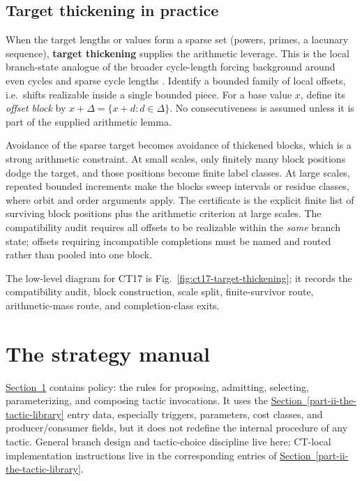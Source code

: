 \documentclass[
  11pt,
]{article}
\theoremstyle{definition}
\newcommand{\secref}[1]{\hyperref[#1]{Section~\ref*{#1}}}
\begin{document}
\subsection*{Target thickening in practice}

When the target lengths or values form a sparse set (powers, primes, a
lacunary sequence), \textbf{target thickening} supplies the arithmetic
leverage. This is the local branch-state analogue of the broader
cycle-length forcing background around even cycles and sparse cycle
lengths
\citep{bondy-simonovits-1974-even-cycles, sudakov-verstraete-2008-cycle-lengths}.
Identify a bounded family of local offsets, i.e.~shifts realizable
inside a single bounded piece. For a base value \(x\), define its
\emph{offset block} by
\(x+\Delta=\{x+d:d\in\Delta\}\). No consecutiveness is assumed unless it
is part of the supplied arithmetic lemma.

Avoidance of the sparse target becomes avoidance of thickened blocks,
which is a strong arithmetic constraint. At small scales, only finitely
many block positions dodge the target, and those positions become finite
label classes. At large scales, repeated bounded increments make the
blocks sweep intervals or residue classes, where orbit and order
arguments apply. The certificate is the explicit finite list of
surviving block positions plus the arithmetic criterion at large scales.
The compatibility audit requires all offsets to be realizable within the
\emph{same} branch state; offsets requiring incompatible completions must
be named and routed rather than pooled into one block.

The low-level diagram for CT17 is Fig.~\ref{fig:ct17-target-thickening};
it records the compatibility audit, block construction, scale split,
finite-survivor route, arithmetic-mass route, and completion-class exits.

\section{The strategy manual}\label{part-iii-the-strategy-manual}

\secref{part-iii-the-strategy-manual} contains policy: the rules for proposing, admitting,
selecting, parameterizing, and composing tactic invocations. It uses the
\secref{part-ii-the-tactic-library} entry data, especially triggers, parameters, cost classes, and
producer/consumer fields, but it does not redefine the internal
procedure of any tactic. General branch design and tactic-choice
discipline live here; CT-local implementation instructions live in the
corresponding entries of \secref{part-ii-the-tactic-library}.
\end{document}
